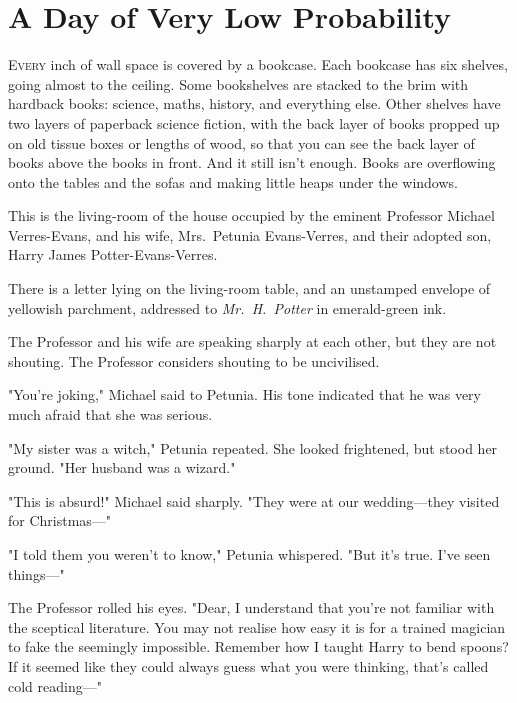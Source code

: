 
\chapter{A Day of Very Low Probability}

\label{ch-ADayofVeryLowProbability}

\lettrine{E}{very} inch of wall space is covered by a bookcase. Each bookcase has six
shelves, going almost to the ceiling. Some bookshelves are stacked to the brim
with hardback books: science, maths, history, and everything else. Other
shelves have two layers of paperback science fiction, with the back layer of
books propped up on old tissue boxes or lengths of wood, so that you can see
the back layer of books above the books in front. And it still isn't enough.
Books are overflowing onto the tables and the sofas and making little heaps
under the windows.

This is the living-room of the house occupied by the eminent Professor Michael
Verres-Evans, and his wife, Mrs.~Petunia Evans-Verres, and their adopted son,
Harry James Potter-Evans-Verres.

There is a letter lying on the living-room table, and an unstamped envelope of
yellowish parchment, addressed to \emph{Mr.~H.~Potter} in emerald-green ink.

The Professor and his wife are speaking sharply at each other, but they are not
shouting. The Professor considers shouting to be uncivilised.

\vspace*{1\baselineskip}

"You're joking," Michael said to Petunia. His tone indicated that he was very
much afraid that she was serious.

"My sister was a witch," Petunia repeated. She looked frightened, but stood her
ground. "Her husband was a wizard."

"This is absurd!" Michael said sharply. "They were at our wedding---they
visited for Christmas---"

"I told them you weren't to know," Petunia whispered. "But it's true. I've seen
things---"

The Professor rolled his eyes. "Dear, I understand that you're not familiar
with the sceptical literature. You may not realise how easy it is for a trained
magician to fake the seemingly impossible. Remember how I taught Harry to bend
spoons? If it seemed like they could always guess what you were thinking,
that's called cold reading---"

